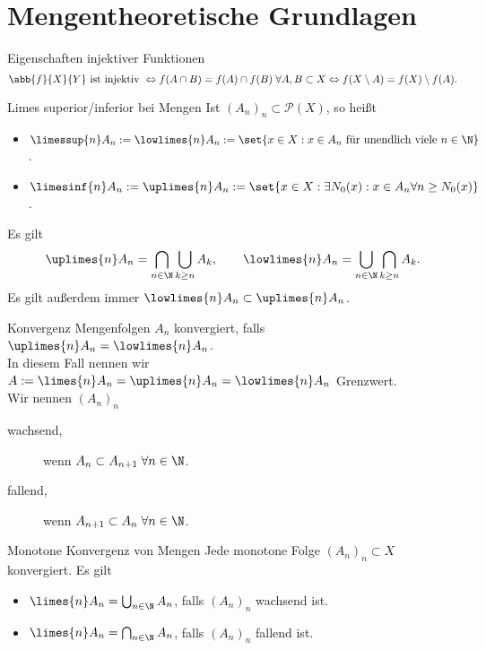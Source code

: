 \section*{Mengentheoretische Grundlagen}

\begin{karte}{Eigenschaften injektiver Funktionen}
    \[ \abb{f}{X}{Y} \text{ ist injektiv } 
    \Leftrightarrow f(A \cap B) = f(A) \cap f(B) \;\forall A, B \subset X 
    \Leftrightarrow f(X \setminus A) = f(X) \setminus f(A). \]
\end{karte}

\begin{karte}{Limes superior/inferior bei Mengen}
	Ist \((A_n)_n \subset \mathcal{P}(X) \), so heißt 
	\begin{itemize}
		\item \( \limessup{n} A_n := \lowlimes{n} A_n := \set{ x \in X: x \in A_n 
			\text{ für unendlich viele } n\in\N } \).
		\item \( \limesinf{n} A_n := \uplimes{n} A_n := \set{ x \in X: \exists N_0(x): x \in A_n 
			\forall n \geq N_0(x) } \).
	\end{itemize}
	Es gilt
	\[ \uplimes{n} A_n = \bigcap_{n\in\N} \bigcup_{k \geq n}A_k, 
	\qquad \lowlimes{n} A_n = \bigcup_{n\in\N} \bigcap_{k\geq n} A_k. \]
	Es gilt außerdem immer \(\lowlimes{n} A_n \subset \uplimes{n} A_n \).
\end{karte}

\begin{karte}{Konvergenz Mengenfolgen}
	\(A_n\) konvergiert, falls \(\uplimes{n} A_n = \lowlimes{n} A_n\). \\
	In diesem Fall nennen wir \(A := \limes{n} A_n = \uplimes{n} A_n = \lowlimes{n} A_n \) Grenzwert.\\
	Wir nennen \((A_n)_n\) 
	\begin{description}
		\item[wachsend,] wenn \( A_n \subset A_{n+1} \;\forall n \in \N \).
		\item[fallend,] wenn \( A_{n+1} \subset A_n \;\forall n \in \N \).
	\end{description}
\end{karte}

\begin{karte}{Monotone Konvergenz von Mengen}
	Jede monotone Folge \( (A_n)_n \subset X \) konvergiert. Es gilt 
	\begin{itemize}
		\item \( \limes{n} A_n = \bigcup_{n\in\N} A_n \), falls \( (A_n)_n \) wachsend ist.
		\item \( \limes{n} A_n = \bigcap_{n\in\N} A_n \), falls \( (A_n)_n \) fallend ist.
	\end{itemize}
\end{karte}